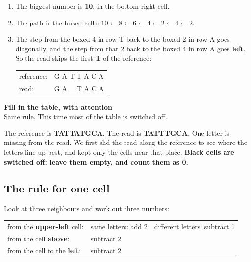 \documentclass[12pt]{article}
\newcommand{\rowh}{\rule{0pt}{0.82cm}}
\begin{document}
\bigskip
\begin{enumerate}
\item The biggest number is \textbf{10}, in the bottom-right cell.
\item The path is the boxed cells: $10 \leftarrow 8 \leftarrow 6 \leftarrow 4
      \leftarrow 2 \leftarrow 4 \leftarrow 2$.
\item The step from the boxed 4 in row T back to the boxed 2 in row A goes
      diagonally, and the step from that 2 back to the boxed 4 in row A goes
      \textbf{left}. So the read skips the first \textbf{T} of the reference:

\begin{center}
\ttfamily
\begin{tabular}{@{}l@{\ \ }l@{}}
reference: & G A T T A C A \\
read:      & G A \_ T A C A
\end{tabular}
\end{center}
\end{enumerate}

\newpage
\renewcommand{\rowh}{\rule{0pt}{0.7cm}}

\begin{center}
{\LARGE\bfseries Fill in the table, with attention}\\[4pt]
{\large Same rule. This time most of the table is switched off.}
\end{center}

\medskip
\noindent
The reference is \textbf{TATTATGCA}. The read is \textbf{TATTTGCA}. One letter is
missing from the read. We first slid the read along the reference to see where
the letters line up best, and kept only the cells near that place.
\textbf{Black cells are switched off: leave them empty, and count them as 0.}

\subsection*{The rule for one cell}

Look at three neighbours and work out three numbers:

\begin{center}
\renewcommand{\arraystretch}{1.4}
\begin{tabular}{@{}lll@{}}
from the \textbf{upper-left} cell: & same letters: add 2 & different letters: subtract 1 \\
from the cell \textbf{above}: & subtract 2 & \\
from the cell to the \textbf{left}: & subtract 2 & \\
\end{tabular}
\end{center}
\end{document}
